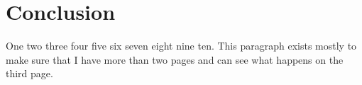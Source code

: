 \section{Conclusion}

One two three four five six seven eight nine ten.  This paragraph exists
mostly to make sure that I have more than two pages and can see what
happens on the third page.
